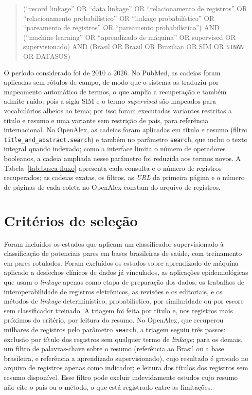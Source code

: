\begin{quote}
\small
(``record linkage'' OR ``data linkage'' OR ``relacionamento de registros'' OR ``relacionamento probabilístico'' OR ``linkage probabilístico'' OR ``pareamento de registros'' OR ``pareamento probabilístico'') AND (``machine learning'' OR ``aprendizado de máquina'' OR supervised OR supervisionado) AND (Brasil OR Brazil OR Brazilian OR SIM OR \texttt{SINAN} OR DATASUS)
\end{quote}

O período considerado foi de 2010 a 2026. No PubMed, as cadeias foram aplicadas sem rótulos de campo, de modo que o sistema as traduziu por mapeamento automático de termos, o que amplia a recuperação e também admite ruído, pois a sigla SIM e o termo \textit{supervised} são mapeados para vocabulários alheios ao tema; por isso foram executadas variantes restritas a título e resumo e uma variante sem restrição de país, para referência internacional. No OpenAlex, as cadeias foram aplicadas em título e resumo (filtro \texttt{title\_and\_abstract.search}) e também no parâmetro \texttt{search}, que inclui o texto integral quando indexado; como a interface limita o número de operadores booleanos, a cadeia ampliada nesse parâmetro foi reduzida aos termos novos. A Tabela~\ref{tab:busca-fluxo} apresenta cada consulta e o número de registros recuperados; as cadeias exatas, os filtros, as \textit{URL} da primeira página e o número de páginas de cada coleta no OpenAlex constam do arquivo de registros.

\section{Critérios de seleção}

Foram incluídos os estudos que aplicam um classificador supervisionado à classificação de potenciais pares em bases brasileiras de saúde, com treinamento em pares rotulados. Foram excluídos os estudos sobre aprendizado de máquina aplicado a desfechos clínicos de dados já vinculados, as aplicações epidemiológicas que usam o \textit{linkage} apenas como etapa de preparação dos dados, os trabalhos de interoperabilidade de registros eletrônicos, as revisões e os editoriais, e os métodos de \textit{linkage} determinístico, probabilístico, por similaridade ou por escore sem classificador treinado. A triagem foi feita por título e, nos registros mais próximos do critério, por leitura do resumo. No OpenAlex, que recuperou milhares de registros pelo parâmetro \texttt{search}, a triagem seguiu três passos: exclusão por título dos registros sem qualquer termo de \textit{linkage}; para os demais, um filtro de palavras-chave sobre o resumo (referência ao Brasil ou a base brasileira, e referência a aprendizado supervisionado), cujo resultado é gravado no arquivo de registros apenas como indicador; e leitura dos títulos dos registros sem resumo disponível. Esse filtro pode excluir indevidamente estudos cujo resumo não cite o país ou o método, o que está registrado entre as limitações.

